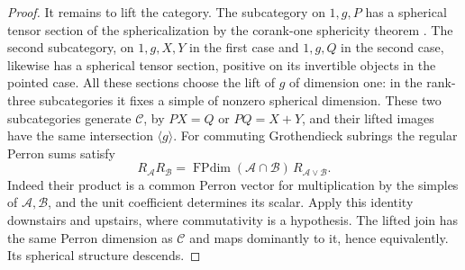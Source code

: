 \documentclass[11pt,reqno]{amsart}
\theoremstyle{remark}\newtheorem{remark}[theorem]{Remark}
\numberwithin{equation}{section}
\begin{document}
\begin{proof}
It remains to lift the category. The subcategory on $1,g,P$ has
a spherical tensor section of the sphericalization by the corank-one
sphericity theorem \cite[Theorem~4.5]{DCW}.
The second subcategory, on $1,g,X,Y$ in the first case and
$1,g,Q$ in the second case, likewise has a spherical tensor
section, positive on its invertible objects in the pointed case.
All these sections choose the lift of $g$ of dimension one:
in the rank-three subcategories it fixes a simple of nonzero
spherical dimension. These two subcategories generate $\mathcal C$, by $PX=Q$ or
$PQ=X+Y$, and their lifted images have the same intersection
$\langle g\rangle$. For commuting Grothendieck subrings the regular
Perron sums satisfy
\[
 R_{\mathcal A} R_{\mathcal B}
  =\operatorname{FPdim}(\mathcal A\cap\mathcal B)\,
    R_{\mathcal A\vee\mathcal B}.
\]
Indeed their product is a common Perron vector for multiplication
by the simples of $\mathcal A,\mathcal B$, and the unit coefficient
determines its scalar. Apply this identity downstairs and upstairs,
where commutativity is a hypothesis. The lifted join has the same
Perron dimension as $\mathcal C$ and maps dominantly to it, hence
equivalently. Its spherical structure descends.
\end{proof}
\end{document}
